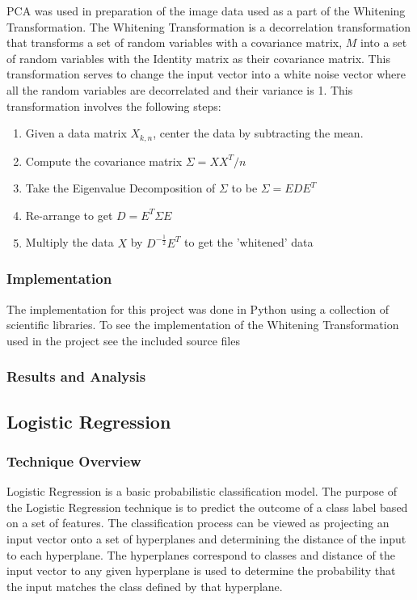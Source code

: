 \documentclass{article}
\begin{document}
  PCA was used in preparation of the image data used as a part of the Whitening Transformation. The Whitening Transformation is a decorrelation
  transformation that transforms a set of random variables with a covariance matrix, $M$ into a set of random variables with the Identity matrix as
  their covariance matrix. This transformation serves to change the input vector into a white noise vector where all the random variables are decorrelated
  and their variance is 1. This transformation involves the following steps: \\
  \begin{enumerate}
    \item Given a data matrix $X_{k,n}$, center the data by subtracting the mean.
	\item Compute the covariance matrix $\Sigma = X X^{T} / n$
	\item Take the Eigenvalue Decomposition of $\Sigma$ to be $\Sigma = E D E^{T}$
	\item Re-arrange to get $D = E^{T} \Sigma E$
	\item Multiply the data $X$ by $D^{-\frac{1}{2}} E^{T}$ to get the 'whitened' data
  \end{enumerate}

  \subsubsection{Implementation}
  
  The implementation for this project was done in Python using a collection of scientific libraries. To see the implementation of the Whitening Transformation
  used in the project see the included source files

  \subsubsection{Results and Analysis}


\subsection{Logistic Regression}
  \subsubsection{Technique Overview}
  
  Logistic Regression is a basic probabilistic classification model. The purpose of the Logistic Regression technique is to predict the outcome of a class label
  based on a set of features. The classification process can be viewed as projecting an input vector onto a set of hyperplanes and determining the distance of the
  input to each hyperplane. The hyperplanes correspond to classes and distance of the input vector to any given hyperplane is used to determine the probability that
  the input matches the class defined by that hyperplane.
\end{document}
